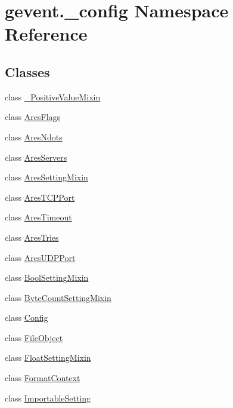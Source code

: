 \hypertarget{namespacegevent_1_1__config}{}\section{gevent.\+\_\+config Namespace Reference}
\label{namespacegevent_1_1__config}
\subsection*{Classes}
\begin{DoxyCompactItemize}
\item 
class \hyperlink{classgevent_1_1__config_1_1___positive_value_mixin}{\+\_\+\+Positive\+Value\+Mixin}
\item 
class \hyperlink{classgevent_1_1__config_1_1_ares_flags}{Ares\+Flags}
\item 
class \hyperlink{classgevent_1_1__config_1_1_ares_ndots}{Ares\+Ndots}
\item 
class \hyperlink{classgevent_1_1__config_1_1_ares_servers}{Ares\+Servers}
\item 
class \hyperlink{classgevent_1_1__config_1_1_ares_setting_mixin}{Ares\+Setting\+Mixin}
\item 
class \hyperlink{classgevent_1_1__config_1_1_ares_t_c_p_port}{Ares\+T\+C\+P\+Port}
\item 
class \hyperlink{classgevent_1_1__config_1_1_ares_timeout}{Ares\+Timeout}
\item 
class \hyperlink{classgevent_1_1__config_1_1_ares_tries}{Ares\+Tries}
\item 
class \hyperlink{classgevent_1_1__config_1_1_ares_u_d_p_port}{Ares\+U\+D\+P\+Port}
\item 
class \hyperlink{classgevent_1_1__config_1_1_bool_setting_mixin}{Bool\+Setting\+Mixin}
\item 
class \hyperlink{classgevent_1_1__config_1_1_byte_count_setting_mixin}{Byte\+Count\+Setting\+Mixin}
\item 
class \hyperlink{classgevent_1_1__config_1_1_config}{Config}
\item 
class \hyperlink{classgevent_1_1__config_1_1_file_object}{File\+Object}
\item 
class \hyperlink{classgevent_1_1__config_1_1_float_setting_mixin}{Float\+Setting\+Mixin}
\item 
class \hyperlink{classgevent_1_1__config_1_1_format_context}{Format\+Context}
\item 
class \hyperlink{classgevent_1_1__config_1_1_importable_setting}{Importable\+Setting}

\end{DoxyCompactItemize}
